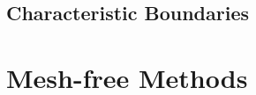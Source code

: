 \subsection{Characteristic Boundaries}

\cite{thompson1987TimeDependentBoundary, thompson1990TimeDependentBoundaryConditions, poinsot1992BoundaryConditionsDirect, poinsot2005TheoreticalNumericalCombustion, sutherland2003ImprovedBoundaryConditions}

















\section{Mesh-free Methods}

